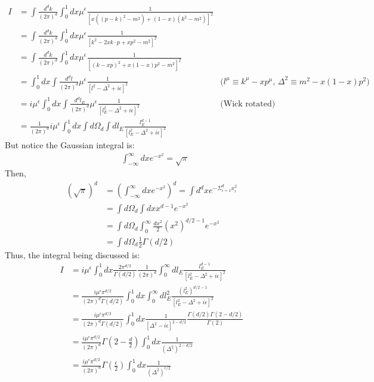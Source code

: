 \documentclass[fleqn]{article}
\begin{document}
\begin{align}
I &= \int \frac{d^{d}k}{(2\pi)^d} \int_{0}^{1}dx \mu^{\epsilon} \frac{1}{[x((p-k)^{2}-m^{2}) + (1-x)(k^{2}-m^{2})]^{2}} &\nonumber\\
&= \int \frac{d^{d}k}{(2\pi)^d} \int_{0}^{1}dx \mu^{\epsilon} \frac{1}{[k^{2} -2xk\cdot p + xp^{2} -m^{2}]^{2}}& \nonumber \\
&= \int \frac{d^{d}k}{(2\pi)^d} \int_{0}^{1}dx \mu^{\epsilon} \frac{1}{[(k-xp)^{2}+x(1-x)p^{2}-m^{2}]^{2}}& \nonumber \\
&=  \int_{0}^{1}dx\int \frac{d^{d}l}{(2\pi)^d} \mu^{\epsilon} \frac{1}{[l^{2}-\Delta^{2} +i\epsilon]^{2}}& \text{($l^{\mu} \equiv k^{\mu}-xp^{\mu}$, $\Delta^{2} \equiv m^{2} - x(1-x)p^{2}$}) \nonumber   \\
& = i\mu^{\epsilon} \int_{0}^{1} dx \int \frac{d^{d}l_E}{(2\pi)^d} \mu^{\epsilon} \frac{1}{[l_{E}^{2}-\Delta^{2} +i\epsilon]^{2}}&  \text{(Wick rotated)} \nonumber \\
&=  \frac{1}{(2\pi)^{d}}i\mu^{\epsilon} \int_{0}^{1} dx \int d \Omega _d \int dl_E \frac{l_{E}^{d-1}}{[l_{E}^{2}-\Delta^{2} +i\epsilon]^{2}}&
\end{align}
But notice the Gaussian integral is:
\begin{align}
\int_{-\infty}^{\infty}dx e^{-x^{2}} = \sqrt{\pi}
\end{align}
Then,
\begin{align}
(\sqrt{\pi})^{d} &= (\int_{-\infty}^{\infty}dx e^{-x^{2}})^{d} = \int d^{d} x e^{-\Sigma _{i=1} ^{d} x_{i} ^{2}}& \nonumber \\ 
& =\int d\Omega _{d} \int dx x^{d-1}e^{-x^{2}}& \nonumber \\ 
& = \int d\Omega _{d} \int _{0}^{\infty} \frac{dx^{2}}{2} (x^2)^{d/2 - 1} e^{-x^2}& \nonumber  \\
& = \int d \Omega _{d} \frac{1}{2} \Gamma (d/2) &
\end{align}
Thus, the integral being discussed is:
\begin{align}
I &= i \mu ^{\epsilon} \int_{0}^{1} dx \frac{2\pi ^{d/2}}{\Gamma(d/2)} \frac{1}{(2\pi)^d} \int _{0}^{\infty}dl_{E} \frac{l_{E}^{d-1}}{[l_{E}^{2} -\Delta ^{2} +i\epsilon]^{2}} & \nonumber \\
&= \frac{i\mu^{\epsilon} \pi ^{d/2}}{(2\pi)^{d}\Gamma(d/2)} \int _{0}^{1} dx  \int _{0}^{\infty}dl_{E}^{2} \frac{(l_{E}^{2})^{d/2 -1}}{[l_{E}^{2} -\Delta ^{2} +i\epsilon]^{2}}&\nonumber \\
&= \frac{i\mu^{\epsilon} \pi ^{d/2}}{(2\pi)^{d}\Gamma(d/2)} \int _{0}^{1} dx \frac{1}{[\Delta ^{2} -i\epsilon]^{2-d/2}} \frac{\Gamma(d/2)\Gamma(2-d/2)}{\Gamma(2)}& \nonumber \\
&= \frac{i\mu^{\epsilon} \pi ^{d/2}}{(2\pi)^{d}} \Gamma(2-\frac{d}{2})\int_{0} ^{1} dx\frac{1}{(\Delta ^{2})^{2-d/2}}& \nonumber \\
&= \frac{i\mu^{\epsilon} \pi ^{d/2}}{(2\pi)^{d}} \Gamma(\frac{\epsilon}{2})\int_{0} ^{1} dx\frac{1}{(\Delta ^{2})^{\epsilon/2}}&
\end{align}
\end{document}
